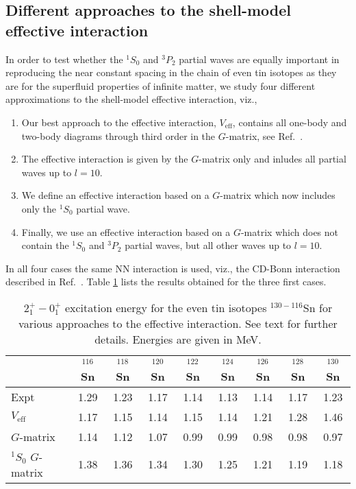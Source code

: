 \documentclass{ws-p9-75x6-50}
\begin{document}
\subsection{Different approaches to the shell-model effective interaction}

In order to test whether the $^1S_0$ and $^3P_2$ partial waves are equally
important in reproducing the near constant spacing in the chain
of even tin isotopes as they are for the superfluid properties of infinite matter,
we study four different approximations to the shell-model
effective interaction, viz.,
\begin{enumerate}
  \item Our best approach to the effective interaction, $V_{\mathrm{eff}}$, contains
        all one-body and two-body diagrams through third order in the $G$-matrix, 
        see Ref.\ \cite{ehho97}. 
  \item The effective interaction is given by the $G$-matrix only and inludes
        all partial waves up to $l=10$.
  \item We define an effective  interaction based on a $G$-matrix which now includes
        only the $^1S_0$ partial wave.
  \item Finally, we use an effective interaction based on a $G$-matrix which does
        not contain the  $^1S_0$ and $^3P_2$ partial waves, but all other waves
        up to $l=10$.  
\end{enumerate}
In all four cases the same NN interaction is used, viz., 
the CD-Bonn interaction described in Ref.\ \cite{cdbonn}.
Table \ref{tab:table1} lists the results obtained for the three first cases.  
\begin{table}[t]
\begin{center}
\caption{ $2^+_1-0^+_1$ excitation energy for the 
even tin isotopes $^{130-116}$Sn for various approaches
to the effective interaction. See text for further details. 
Energies are given in MeV. }\footnotesize
\begin{tabular}{lcccccccc}\hline
 & {$^{116}$Sn} & {$^{118}$Sn} & {$^{120}$Sn} &{$^{122}$Sn} & {$^{124}$Sn} & {$^{126}$Sn} & {$^{128}$Sn} & {$^{130}$Sn} \\ \hline
Expt & 1.29 & 1.23 & 1.17 & 1.14 & 1.13 & 1.14 & 1.17 & 1.23 \\
$V_{\mathrm{eff}}$ & 1.17 & 1.15 & 1.14 & 1.15 & 1.14 & 1.21 & 1.28 & 1.46 \\
$G$-matrix &1.14 & 1.12& 1.07 & 0.99 & 0.99 & 0.98 & 0.98 & 0.97  \\
$^1S_0$ $G$-matrix &1.38 &1.36 &1.34 &1.30 & 1.25& 1.21 &1.19 &1.18 \\\hline
\end{tabular}
\end{center}
\label{tab:table1}
\end{table}
\end{document}
